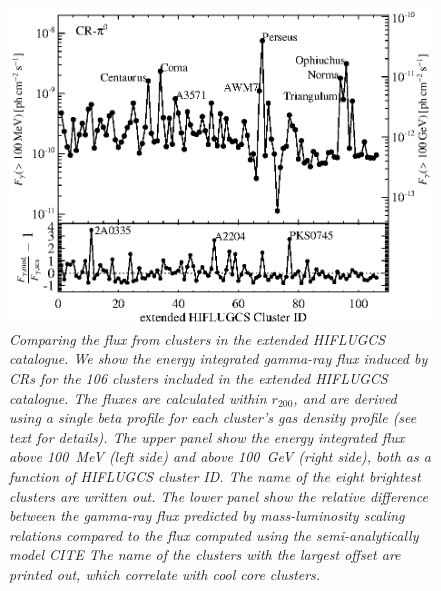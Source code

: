 \documentclass[10pt,aps,pra,reprint,amsmath,amsfonts,amssymb,showpacs]{revtex4-1}
\newcommand{\rvir}{r_{200}}
\begin{document}
\begin{figure}%
\begin{minipage}{2.0\columnwidth}
 \includegraphics[width=0.99\columnwidth]{figures/Flux.comp.CR.eps}
\caption{\it Comparing the flux from clusters in the extended HIFLUGCS
  catalogue. We show the energy integrated gamma-ray flux induced by
  CRs for the 106 clusters included in the extended HIFLUGCS
  catalogue. The fluxes are calculated within $\rvir$, and are derived
  using a single beta profile for each cluster's gas density profile
  (see text for details). The upper panel show the energy integrated
  flux above 100~MeV (left side) and above 100~GeV (right side), both
  as a function of HIFLUGCS cluster ID. The name of the eight
  brightest clusters are written out. The lower panel show the
  relative difference between the gamma-ray flux predicted by
  mass-luminosity scaling relations compared to the flux computed
  using the semi-analytically model CITE The name of the
  clusters with the largest offset are printed out, which correlate
  with cool core clusters.}
 \label{fig19}
\end{minipage}
\end{figure}
\end{document}
